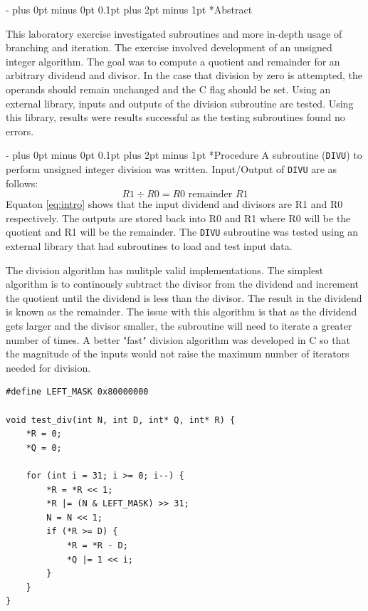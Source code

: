 \documentclass[\FontSize\FontUnit,letterpaper,oneside]{article}
\makeatletter
\def\code#1{\texttt{#1}}
\renewcommand \section{
    \@startsection{section}{1}{\z@}
      {\dimexpr \FontSize\FontUnit * 2 - \parskip \relax plus 0pt minus 0pt}
      {0.1pt plus 2pt minus 1pt} %
      {\normalfont\normalsize\bfseries}}
\makeatother
\begin{document}
\section*{Abstract}

This laboratory exercise investigated subroutines and more in-depth usage
of branching and iteration. The exercise involved development of an unsigned
integer algorithm. The goal was to compute a quotient and remainder for an
arbitrary dividend and divisor. In the case that division by zero is attempted, the operands should remain unchanged and the C flag should
be set. Using an external library, inputs and outputs of the division 
subroutine are tested. Using this library, results were results successful
as the testing subroutines found no errors.

\section*{Procedure}
A subroutine (\code{DIVU}) to perform unsigned integer division was 
written. Input/Output of \code{DIVU} are as follows:
\begin{equation}
\label{eq:intro}
R1 \div R0 = R0 \text{ remainder } R1
\end{equation}
Equaton \ref{eq:intro} shows that the input dividend and divisors are R1 
and R0 respectively. The outputs are stored back into R0 and R1 where R0
will be the quotient and R1 will be the remainder. The \code{DIVU}
subroutine was tested using an external library that had subroutines to
load and test input data. 

The division algorithm has mulitple valid implementations. The simplest
algorithm is to continously subtract the divisor from the dividend and
increment the quotient until the dividend is less than the divisor. The
result in the dividend is known as the remainder. The issue with this
algorithm is that as the dividend gets larger and the divisor smaller, the
subroutine will need to iterate a greater number of times. A better "fast"
division algorithm was developed in C so that the magnitude of the inputs
would not raise the maximum number of iterators needed for division.

\begin{lstlisting}[style=CStyle]
#define LEFT_MASK 0x80000000

void test_div(int N, int D, int* Q, int* R) {
    *R = 0;
    *Q = 0;

    for (int i = 31; i >= 0; i--) {
        *R = *R << 1;
        *R |= (N & LEFT_MASK) >> 31;
        N = N << 1;
        if (*R >= D) {
            *R = *R - D;
            *Q |= 1 << i;
        }
    }
}
\end{lstlisting}
\end{document}
